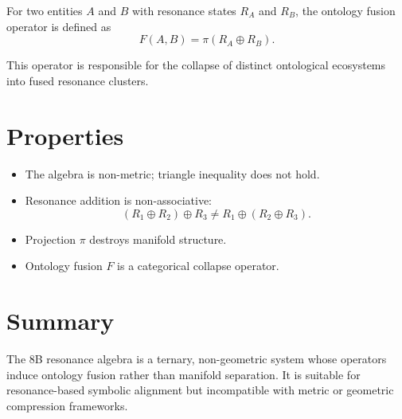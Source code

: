 \documentclass[11pt]{article}
\begin{document}
For two entities $A$ and $B$ with resonance states $R_A$ and $R_B$, the ontology fusion operator is defined as
\[
F(A, B) = \pi\left( R_A \oplus R_B \right).
\]

This operator is responsible for the collapse of distinct ontological ecosystems into fused resonance clusters.

\section{Properties}

\begin{itemize}
    \item The algebra is non-metric; triangle inequality does not hold.
    \item Resonance addition is non-associative:
    \[
    (R_1 \oplus R_2) \oplus R_3 \neq R_1 \oplus (R_2 \oplus R_3).
    \]
    \item Projection $\pi$ destroys manifold structure.
    \item Ontology fusion $F$ is a categorical collapse operator.
\end{itemize}

\section{Summary}

The 8B resonance algebra is a ternary, non-geometric system whose operators induce ontology fusion rather than manifold separation. It is suitable for resonance-based symbolic alignment but incompatible with metric or geometric compression frameworks.
\end{document}
